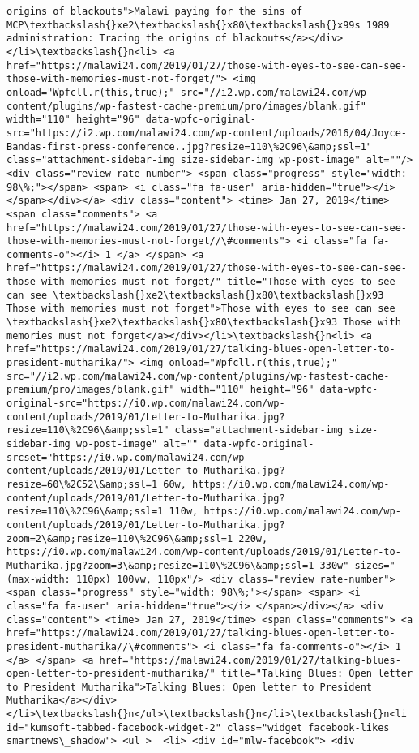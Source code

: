 \documentclass[11pt]{article}
\begin{document}
\begin{Verbatim}[commandchars=\\\{\}]
origins of blackouts">Malawi paying for the sins of MCP\textbackslash{}xe2\textbackslash{}x80\textbackslash{}x99s 1989 administration: Tracing the origins of blackouts</a></div></li>\textbackslash{}n<li> <a href="https://malawi24.com/2019/01/27/those-with-eyes-to-see-can-see-those-with-memories-must-not-forget/"> <img onload="Wpfcll.r(this,true);" src="//i2.wp.com/malawi24.com/wp-content/plugins/wp-fastest-cache-premium/pro/images/blank.gif" width="110" height="96" data-wpfc-original-src="https://i2.wp.com/malawi24.com/wp-content/uploads/2016/04/Joyce-Bandas-first-press-conference..jpg?resize=110\%2C96\&amp;ssl=1" class="attachment-sidebar-img size-sidebar-img wp-post-image" alt=""/> <div class="review rate-number"> <span class="progress" style="width: 98\%;"></span> <span> <i class="fa fa-user" aria-hidden="true"></i> </span></div></a> <div class="content"> <time> Jan 27, 2019</time> <span class="comments"> <a href="https://malawi24.com/2019/01/27/those-with-eyes-to-see-can-see-those-with-memories-must-not-forget//\#comments"> <i class="fa fa-comments-o"></i> 1 </a> </span> <a href="https://malawi24.com/2019/01/27/those-with-eyes-to-see-can-see-those-with-memories-must-not-forget/" title="Those with eyes to see can see \textbackslash{}xe2\textbackslash{}x80\textbackslash{}x93 Those with memories must not forget">Those with eyes to see can see \textbackslash{}xe2\textbackslash{}x80\textbackslash{}x93 Those with memories must not forget</a></div></li>\textbackslash{}n<li> <a href="https://malawi24.com/2019/01/27/talking-blues-open-letter-to-president-mutharika/"> <img onload="Wpfcll.r(this,true);" src="//i2.wp.com/malawi24.com/wp-content/plugins/wp-fastest-cache-premium/pro/images/blank.gif" width="110" height="96" data-wpfc-original-src="https://i0.wp.com/malawi24.com/wp-content/uploads/2019/01/Letter-to-Mutharika.jpg?resize=110\%2C96\&amp;ssl=1" class="attachment-sidebar-img size-sidebar-img wp-post-image" alt="" data-wpfc-original-srcset="https://i0.wp.com/malawi24.com/wp-content/uploads/2019/01/Letter-to-Mutharika.jpg?resize=60\%2C52\&amp;ssl=1 60w, https://i0.wp.com/malawi24.com/wp-content/uploads/2019/01/Letter-to-Mutharika.jpg?resize=110\%2C96\&amp;ssl=1 110w, https://i0.wp.com/malawi24.com/wp-content/uploads/2019/01/Letter-to-Mutharika.jpg?zoom=2\&amp;resize=110\%2C96\&amp;ssl=1 220w, https://i0.wp.com/malawi24.com/wp-content/uploads/2019/01/Letter-to-Mutharika.jpg?zoom=3\&amp;resize=110\%2C96\&amp;ssl=1 330w" sizes="(max-width: 110px) 100vw, 110px"/> <div class="review rate-number"> <span class="progress" style="width: 98\%;"></span> <span> <i class="fa fa-user" aria-hidden="true"></i> </span></div></a> <div class="content"> <time> Jan 27, 2019</time> <span class="comments"> <a href="https://malawi24.com/2019/01/27/talking-blues-open-letter-to-president-mutharika//\#comments"> <i class="fa fa-comments-o"></i> 1 </a> </span> <a href="https://malawi24.com/2019/01/27/talking-blues-open-letter-to-president-mutharika/" title="Talking Blues: Open letter to President Mutharika">Talking Blues: Open letter to President Mutharika</a></div></li>\textbackslash{}n</ul>\textbackslash{}n</li>\textbackslash{}n<li id="kumsoft-tabbed-facebook-widget-2" class="widget facebook-likes smartnews\_shadow"> <ul >  <li> <div id="mlw-facebook"> <div 
\end{Verbatim}
\end{document}
